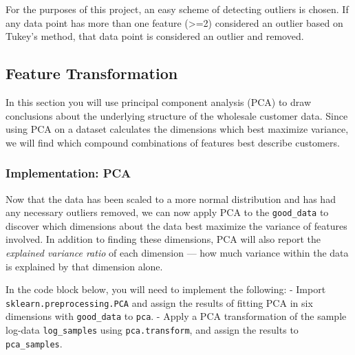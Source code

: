 \documentclass{article}
\begin{document}
For the purposes of this project, an easy scheme of detecting outliers
is chosen. If any data point has more than one feature
(\textgreater{}=2) considered an outlier based on Tukey's method, that
data point is considered an outlier and removed.

    \subsection{Feature Transformation}\label{feature-transformation}

In this section you will use principal component analysis (PCA) to draw
conclusions about the underlying structure of the wholesale customer
data. Since using PCA on a dataset calculates the dimensions which best
maximize variance, we will find which compound combinations of features
best describe customers.

    \subsubsection{Implementation: PCA}\label{implementation-pca}

Now that the data has been scaled to a more normal distribution and has
had any necessary outliers removed, we can now apply PCA to the
\texttt{good\_data} to discover which dimensions about the data best
maximize the variance of features involved. In addition to finding these
dimensions, PCA will also report the \emph{explained variance ratio} of
each dimension --- how much variance within the data is explained by
that dimension alone.

In the code block below, you will need to implement the following: -
Import \texttt{sklearn.preprocessing.PCA} and assign the results of
fitting PCA in six dimensions with \texttt{good\_data} to \texttt{pca}.
- Apply a PCA transformation of the sample log-data
\texttt{log\_samples} using \texttt{pca.transform}, and assign the
results to \texttt{pca\_samples}.
\end{document}
